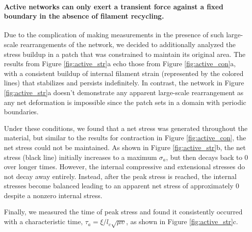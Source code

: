 \documentclass[10pt,letterpaper]{article}
\begin{document}
\paragraph{Active networks can only exert a transient force against a fixed boundary in the absence of filament recycling.}

Due to the complication of making measurements in the presence of such large-scale rearrangements of the network, we decided to additionally analyzed the stress buildup in a patch that was constrained to maintain its original area.  The results from Figure \ref{fig:active_str}a echo those from Figure \ref{fig:active_con}a, with a consistent buildup of internal filament strain (represented by the colored lines) that stabilizes and persists indefinitely.  In contrast, the network in Figure \ref{fig:active_str}a doesn't demonstrate any apparent large-scale rearrangement as any net deformation is impossible since the patch sets in a domain with periodic boundaries.

Under these conditions, we found that a net stress was generated throughout the material, but similar to the results for contraction in Figure \ref{fig:active_con}, the net stress could not be maintained.  As shown in Figure \ref{fig:active_str}b, the net stress (black line) initially increases to a maximum $\sigma_a$, but then decays back to 0 over longer times. However, the internal compressive and extensional stresses do not decay away entirely.  Instead, after the peak stress is reached, the internal stresses become balanced leading to an apparent net stress of approximately 0 despite a nonzero internal stress.  

Finally, we measured the time of peak stress and found it consistently occurred with a characteristic time, $\tau_a=\xi/l_c\sqrt{\mu\upsilon}$, as shown in Figure \ref{fig:active_str}c. 
\end{document}
